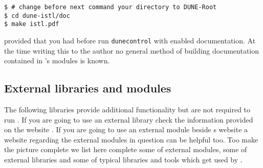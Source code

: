 \begin{lstlisting}[style=Bash]
$ # change before next command your directory to DUNE-Root
$ cd dune-istl/doc
$ make istl.pdf
\end{lstlisting}

provided that you had before run \texttt{dunecontrol} with enabled documentation.
At the time writing this to the author no general method of building documentation contained in \Dune's modules is known.


\subsection{External libraries and modules} \label{sec:external-modules-libraries}

The following libraries provide additional functionality but are not required to run \Dumux. 
If you are going to use an external library check the information provided on the \Dune website \cite{DUNE-EXT-LIB}. If you are going to use an external \Dune module beside {\Dune}s website a website \cite{DUNE-EXT-MOD} regarding the external modules in question can be helpful too.
Too make the picture complete we list here complete some of external modules, some of external libraries and some of typical libraries and tools which get used by \Dune.

